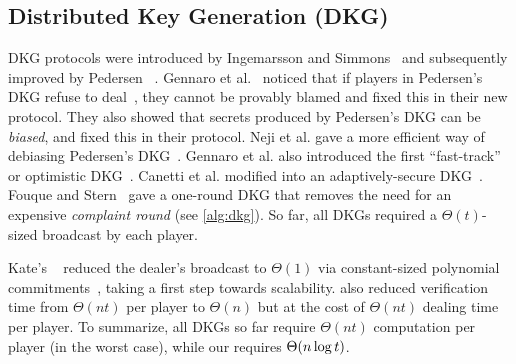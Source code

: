 \subsection{Distributed Key Generation (DKG)}
\label{s:related-work:dkg}
DKG protocols were introduced by Ingemarsson and Simmons~\cite{Ingemarsson1991} and subsequently improved by Pedersen ~\cite{Pedersen1991AThreshold,Pedersen1991Non}.
Gennaro et al.~\cite{GJKR07} noticed that if players in Pedersen's DKG refuse to deal~\cite{Pedersen1991AThreshold}, they cannot be provably blamed and fixed this in their new \jfdkg protocol.
They also showed that secrets produced by Pedersen's DKG can be \textit{biased}, and fixed this in their \newdkg protocol.
Neji et al. gave a more efficient way of debiasing Pedersen's DKG~\cite{NBB16}.
Gennaro et al. also introduced the first ``fast-track'' or optimistic DKG~\cite{GRR98p}.
Canetti et al. modified \newdkg into an adaptively-secure DKG~\cite{CGJ+99}.
Fouque and Stern~\cite{FS01} gave a one-round DKG that removes the need for an expensive \textit{complaint round} (see \cref{alg:dkg}).
So far, all DKGs required a $\Theta(t)$-sized broadcast by each player.

Kate's \ejfdkg~\cite{Kate2010} reduced the dealer's broadcast to $\Theta(1)$ via constant-sized polynomial commitments~\cite{KZG10a}, taking a first step towards scalability.
\ejfdkg also reduced verification time from $\Theta(nt)$ per player to $\Theta(n)$ but at the cost of $\Theta(nt)$ dealing time per player.
To summarize, all DKGs so far require $\Theta(nt)$ computation per player (in the worst case), while our \ourdkg requires $\Theta(n\log{t})$.

